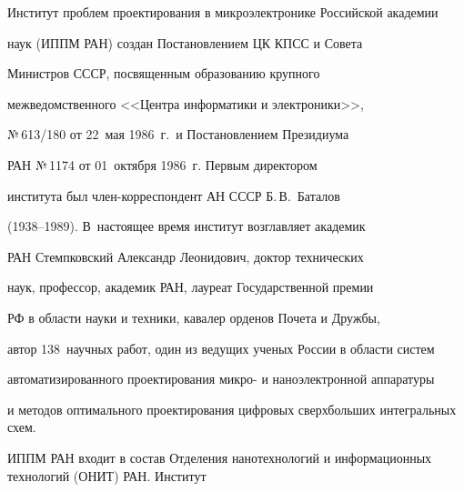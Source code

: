 




Институт проблем проектирования в микроэлектронике Российской академии


наук (ИППМ РАН) создан Постановлением ЦК КПСС и Совета 


Министров СССР, посвященным образованию крупного 


межведомственного <<Центра информатики и электроники>>, 


№\,613/180 от 22~мая 1986~г.\ и Постановлением Президиума 


РАН №\,1174 от 01~октября 1986~г. Первым директором 


института был член-корреспондент АН СССР Б.\,В.~Баталов 


(1938--1989). В~настоящее время институт возглавляет академик 


РАН Стемпковский Александр Леонидович, доктор технических 


наук, профессор, академик РАН, лауреат Государственной премии 


РФ в области науки и техники, кавалер орденов Почета и Дружбы, 


автор  138~научных работ, один из ведущих ученых России в области сис\-тем 


автоматизированного проектирования мик\-ро- и наноэлектронной аппаратуры 


и методов оптимального проектирования цифровых сверхбольших интегральных схем. 





ИППМ РАН входит в состав Отделения нанотехнологий и информационных технологий (ОНИТ) РАН. Институт  


